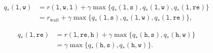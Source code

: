 \documentclass[a4paper,11pt]{article}
\numberwithin{equation}{section}
\theoremstyle{remark}
\begin{document}
\begin{align*}
	q_*(\texttt{l}, \texttt{w}) & = r(\texttt{l}, \texttt{w}, \texttt{l}) + 
	\gamma \max\{ q_*(\texttt{l}, \texttt{s}), q_*(\texttt{l}, \texttt{w}), q_*(\texttt{l}, \texttt{re}) \}  \\
	& = r_{\text{wait}} + \gamma \max \{ q_*(\texttt{l}, \texttt{s}), q_*(\texttt{l}, \texttt{w}), q_*(\texttt{l}, \texttt{re}) \},
\end{align*}

\begin{align*}
	q_*(\texttt{l}, \texttt{re}) & = r(\texttt{l}, \texttt{re}, \texttt{h}) + 
	\gamma \max\{ q_*(\texttt{h}, \texttt{s}), q_*(\texttt{h}, \texttt{w}) \}  \\
	& = \gamma \max \{ q_*(\texttt{h}, \texttt{s}), q_*(\texttt{h}, \texttt{w}) \}.
\end{align*}
\end{document}
